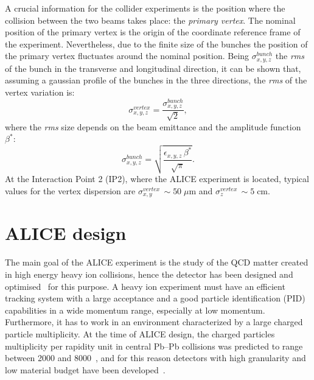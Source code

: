 A crucial information for the collider experiments is the position where the collision
between the two beams takes place: the \textit{primary vertex}. 
The nominal position of the primary vertex is the origin of the coordinate reference frame of the 
experiment. Nevertheless, due to the finite size of the bunches the position of the primary
vertex fluctuates around the nominal position.
Being $\sigma^{bunch}_{x,y,z}$ the \textit{rms} of the bunch in the transverse and longitudinal
direction, it can be shown that, assuming a gaussian profile of the bunches in the three directions,
the \textit{rms} of the vertex variation is:
\begin{equation}
    \sigma^{vertex}_{x,y,z} = \frac{\sigma^{bunch}_{x,y,z}}{\sqrt{2}},
\end{equation}
where the \textit{rms} size depends on the beam emittance and the amplitude function $\beta^{*}$:
\begin{equation}
    \sigma^{bunch}_{x,y,z} = \sqrt{\frac{\epsilon_{x,y,z}\,\beta^{*}}{\sqrt{\pi}}}.
\end{equation}
At the Interaction Point 2 (IP2), where the ALICE experiment is located, typical values for the vertex dispersion are 
$\sigma^{vertex}_{x,y}\,\sim 50\;\mu\mathrm{m}$ and $\sigma^{vertex}_{z}\,\sim 5\;\mathrm{cm}$.

%
%
\section{ALICE design} \label{sec:3.2}

The main goal of the ALICE experiment is the study of the QCD matter created in high energy heavy
ion collisions, hence the detector has been designed and optimised~\cite{alicedesign1,alicedesign2}
for this purpose.
A heavy ion experiment must have an efficient tracking system with a large acceptance and a good
particle identification (PID) capabilities in a wide momentum range, especially at low momentum.
Furthermore, it has to work in an environment characterized by a large charged particle multiplicity.
At the time of ALICE design, the charged particles multiplicity per rapidity unit in central Pb–Pb 
collisions was predicted to range between 2000 and 8000~\cite{alicemulti}, and for this reason
detectors with high granularity and low material budget have been 
developed~\cite{alicedesign1,alicedesign2}.

